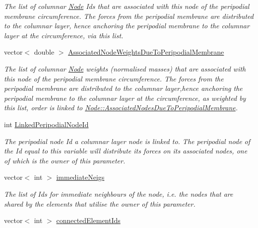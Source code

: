 \begin{DoxyCompactItemize}
\begin{DoxyCompactList}\small\item\em The list of columnar \hyperlink{classNode}{Node} Id\textquotesingle{}s that are associated with this node of the peripodial membrane circumference. The forces from the peripodial membrane are distributed to the columnar layer, hence anchoring the peripodial membrane to the columnar layer at the circumference, via this list. \end{DoxyCompactList}\item 
\hypertarget{classNode_ac18a473bf44d200917cf27be42aa8a42}{}vector$<$ double $>$ \hyperlink{classNode_ac18a473bf44d200917cf27be42aa8a42}{Associated\+Node\+Weights\+Due\+To\+Peripodial\+Membrane}\label{classNode_ac18a473bf44d200917cf27be42aa8a42}

\begin{DoxyCompactList}\small\item\em The list of columnar \hyperlink{classNode}{Node} weights (normalised masses) that are associated with this node of the peripodial membrane circumference. The forces from the peripodial membrane are distributed to the columnar layer,hence anchoring the peripodial membrane to the columnar layer at the circumference, as weighted by this list, order is linked to \hyperlink{classNode_a55ffe3c94ccad326737b510b47deff31}{Node\+::\+Associated\+Nodes\+Due\+To\+Peripodial\+Membrane}. \end{DoxyCompactList}\item 
\hypertarget{classNode_a27a5cb226f56c7598f7e90887c664ed4}{}int \hyperlink{classNode_a27a5cb226f56c7598f7e90887c664ed4}{Linked\+Peripodial\+Node\+Id}\label{classNode_a27a5cb226f56c7598f7e90887c664ed4}

\begin{DoxyCompactList}\small\item\em The peripodial node Id a columnar layer node is linked to. The peripodial node of the Id equal to this variable will distribute its forces on its associated nodes, one of which is the owner of this parameter. \end{DoxyCompactList}\item 
\hypertarget{classNode_ab22060fb9f61a0d93ec52e6045828782}{}vector$<$ int $>$ \hyperlink{classNode_ab22060fb9f61a0d93ec52e6045828782}{immediate\+Neigs}\label{classNode_ab22060fb9f61a0d93ec52e6045828782}

\begin{DoxyCompactList}\small\item\em The list of Id\textquotesingle{}s for immediate neighbours of the node, i.\+e. the nodes that are shared by the elements that utilise the owner of this parameter. \end{DoxyCompactList}\item 
\hypertarget{classNode_a18bae606efb025cc90b4c117776e0bf9}{}vector$<$ int $>$ \hyperlink{classNode_a18bae606efb025cc90b4c117776e0bf9}{connected\+Element\+Ids}\label{classNode_a18bae606efb025cc90b4c117776e0bf9}


\end{DoxyCompactItemize}
